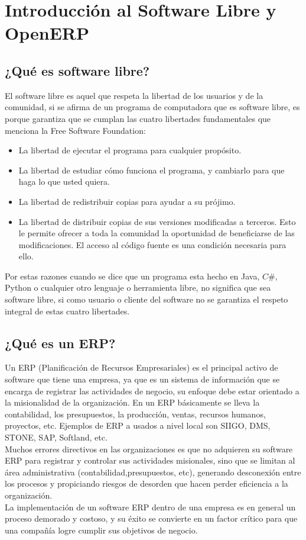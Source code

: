 \section{Introducción al Software Libre y OpenERP}
\subsection{¿Qué es software libre?}
El software libre es aquel que respeta la libertad de los usuarios y de la comunidad, si se afirma de un programa de computadora que es software libre, es porque 
garantiza que se cumplan las cuatro libertades fundamentales que menciona la Free Software Foundation\cite{GNU}:
\begin{itemize}
 \item La libertad de ejecutar el programa para cualquier propósito.
 \item La libertad de estudiar cómo funciona el programa, y cambiarlo para que haga lo que usted quiera. 
 \item La libertad de redistribuir copias para ayudar a su prójimo.
 \item La libertad de distribuir copias de sus versiones modificadas a terceros. Esto le permite ofrecer a toda la comunidad la oportunidad de 
 beneficiarse de las modificaciones. El acceso al código fuente es una condición necesaria para ello. 
\end{itemize}
Por estas razones cuando se dice que un programa esta hecho en Java, $C\#$, Python o cualquier otro lenguaje o herramienta libre, no significa que sea software libre, si como usuario o cliente del software no
se garantiza el respeto integral de estas cuatro libertades. 
\subsection{¿Qué es un ERP?}
Un ERP (Planificación de Recursos Empresariales) es el principal activo de software que tiene una empresa, ya que es un sistema de información que se encarga
de registrar las actividades de negocio, su enfoque debe estar orientado a la misionalidad de la organización. En un ERP básicamente se lleva  
la contabilidad, los presupuestos, la producción, ventas, recursos humanos, proyectos, etc. Ejemplos de ERP a usados a nivel local son SIIGO, DMS, STONE, SAP, Softland, etc.\\
Muchos errores directivos en las organizaciones es que no adquieren su software ERP para registrar y controlar sus actividades misionales, sino que se limitan al área 
administrativa (contabilidad,presupuestos, etc), generando desconexión entre los procesos y propiciando riesgos de desorden que hacen perder eficiencia a la organización.\\
La implementación de un software ERP dentro de una empresa es en general un proceso demorado y costoso, y su éxito se convierte en un factor crítico para que 
una compañía logre cumplir sus objetivos de negocio. 
